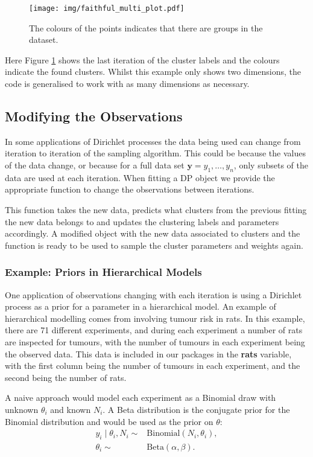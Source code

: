 \documentclass[nojss]{jss}
\begin{document}
\begin{figure}[tb]
  \centering
	\texttt{[image: img/faithful\_multi\_plot.pdf]}
	\caption{The colours of the points indicates that there are groups in the  dataset.}
	\label{fig:clustering}
\end{figure}

Here Figure \ref{fig:clustering} shows the last iteration of the cluster labels and the colours indicate the found clusters. Whilst this example only shows two dimensions, the code is generalised to work with as many dimensions as necessary.


\subsection{Modifying the Observations}
In some applications of Dirichlet processes the data being used can change from iteration to iteration of the sampling algorithm. This could be because the values of the data change, or because for a full data set $\mathbf{y} = y_1 , \ldots , y_n$, only subsets of the data are used at each iteration. When fitting a DP object we provide the appropriate function  to change the observations between iterations.

This function takes the new data, predicts what clusters from the previous fitting the new data belongs to and updates the clustering labels and parameters accordingly. A modified object with the new data associated to clusters and the function  is ready to be used to sample the cluster parameters and weights again.

\subsubsection{Example: Priors in Hierarchical Models}
One application of observations changing with each iteration is using a Dirichlet process as a prior for a parameter in a hierarchical model. An example of hierarchical modelling comes from \cite{gelman_bayesian_2014} involving tumour risk in rats. In this example, there are 71 different experiments, and during each experiment a number of rats are inspected for tumours, with the number of tumours in each experiment being the observed data. This data is included in our packages in the \textbf{rats} variable, with the first column being the number of tumours in each experiment, and the second being the number of rats.

A naive approach would model each experiment as a Binomial draw with unknown $\theta _i$ and known $N_i$. A Beta distribution is the conjugate prior for the Binomial distribution and would be used as the prior on $\theta$:
\begin{align*}
y_i \mid \theta_i, N_i \sim & \text{Binomial}(N_i,\theta_i), \\
\theta_i \sim & \text{Beta}(\alpha, \beta).
\end{align*}
\end{document}
